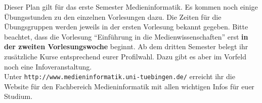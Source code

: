 Dieser Plan gilt für das erste Semester Medieninformatik. 
Es kommen noch einige Übungsstunden zu den einzelnen Vorlesungen dazu. Die Zeiten für die Übungsgruppen werden jeweils in der ersten Vorlesung bekannt gegeben.
Bitte beachtet, dass die Vorlesung "`Einführung in die Medienwissenschaften"' erst \textbf{in der zweiten Vorlesungswoche} beginnt.
Ab dem dritten Semester belegt ihr zusätzliche Kurse entsprechend eurer Profilwahl. Dazu gibt es aber im Vorfeld noch eine Infoveranstaltung.\\
Unter \texttt{http://www.medieninformatik.uni-tuebingen.de/} erreicht ihr die Website für den Fachbereich Medieninformatik mit allen wichtigen Infos für euer Studium. 
